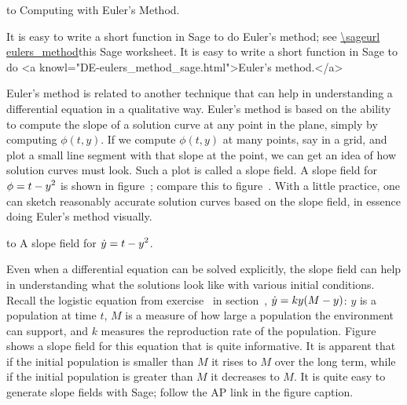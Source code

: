 \figure
\texonly
{}
\null
\hbox to
\endtexonly
{}
\begincaption
Computing with Euler's Method.
\endcaption
\endfigure

\texonly
It is easy to write a short function in Sage to do Euler's method; 
see \expandafter\url\expandafter{\sageurl eulers_method}this Sage worksheet.\endurl
\endtexonly
\htmlonly
It is easy to write a short function in Sage to do  
<a knowl="DE-eulers_method_sage.html">Euler's method.</a>
\endhtmlonly
\endexample

Euler's method is related to another technique that can help in
understanding a differential equation in a qualitative way. Euler's
method is based on the ability to compute the slope of a solution
curve at any point in the plane, simply by computing $\phi(t,y)$. If
we compute $\phi(t,y)$ at many points, say in a grid, and plot a small
line segment with that slope at the point, we can get an idea of how
solution curves must look. Such a plot is called a 
{\dfont slope field}. A slope field for 
$\displaystyle\phi=t-y^2$ is shown in figure~; compare
this to figure~.
With a little practice, one can sketch reasonably accurate solution
curves based on the slope field, in essence doing Euler's method
visually.

\figure
\texonly
\hbox to 
\endtexonly
{}
\begincaption
A slope field for $\displaystyle\dot y=t-y^2$.
\endcaption
\endfigure

Even when a differential equation can be solved explicitly, the slope
field can help in understanding what the solutions look like with
various initial conditions. Recall the logistic equation from
exercise~ in 
section~, $\displaystyle\dot y =
ky(M-y)$: $y$ is a population at time $t$, $M$ is a measure of how
large a population the environment can support, and $k$ measures the
reproduction rate of the population.
Figure~ shows a slope field
for this equation that is quite informative. 
It is apparent that if the initial population is smaller than $M$ it
rises to $M$ over the long term, while if the initial population is
greater than $M$ it decreases to $M$.
\texonly
It is quite easy to
generate slope fields with Sage; follow the AP link in the figure caption.
\endtexonly


